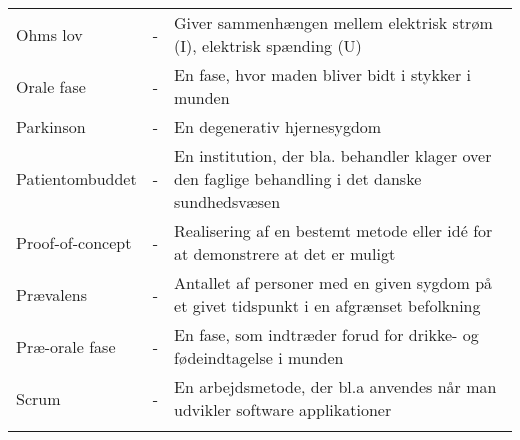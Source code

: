 \begin{table}[H]
\begin{tabularx}{\linewidth}{l l X}
Ohms lov& - &   Giver sammenhængen mellem elektrisk strøm (I), elektrisk spænding (U)\\ \addlinespace[2mm]
Orale fase		& - & En fase, hvor maden bliver bidt i stykker i munden  \\ \addlinespace[2mm]

Parkinson  & - & En degenerativ hjernesygdom \\ 
\addlinespace[2mm]
Patientombuddet 			& - &  En institution, der bla. behandler klager over den faglige behandling i det danske sundhedsvæsen \\ \addlinespace[2mm]
Proof-of-concept& - &  Realisering af en bestemt metode eller idé for at demonstrere at det er muligt \\ \addlinespace[2mm]
Prævalens 			& - &  Antallet af personer med en given sygdom på et givet tidspunkt i en afgrænset befolkning \\ \addlinespace[2mm]
Præ-orale fase	& - & En fase, som indtræder forud for drikke- og fødeindtagelse i munden  \\ \addlinespace[2mm]

Scrum 			& - &  En arbejdsmetode, der bl.a anvendes når man udvikler software applikationer \\ \addlinespace[2mm]























\end{tabularx}
\end{table}


